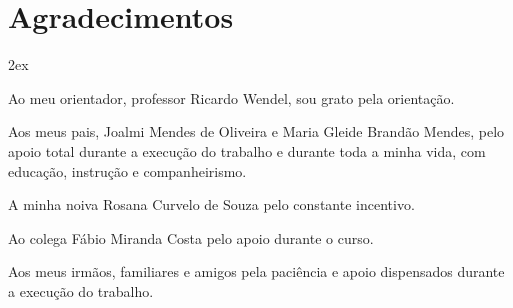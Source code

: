 

%


%
%


\chapter*{Agradecimentos}
\thispagestyle{empty}

\begin{trivlist}  \itemsep 2ex

\item Ao meu orientador, professor Ricardo Wendel, sou grato pela orientação.

\item Aos meus pais, Joalmi Mendes de Oliveira e Maria Gleide Brandão Mendes, pelo apoio total durante a execução do trabalho e durante toda a minha vida, com educação, instrução e companheirismo.

\item A minha noiva Rosana Curvelo de Souza pelo constante incentivo.

\item Ao colega Fábio Miranda Costa pelo apoio durante o curso.

\item Aos meus irmãos, familiares e amigos pela paciência e apoio dispensados durante a execução do trabalho.

\end{trivlist}
